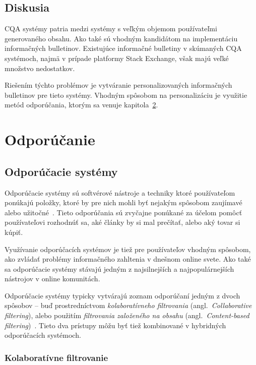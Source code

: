 \section{Diskusia}

CQA systémy patria medzi systémy s veľkým objemom používateľmi generovaného obsahu. Ako také sú vhodným kandidátom na
implementáciu informačných bulletinov. Existujúce informačné bulletiny v skúmaných CQA systémoch, najmä v prípade
platformy Stack Exchange, však majú veľké množstvo nedostatkov.

Riešením týchto problémov je vytváranie personalizovaných informačných bulletinov pre tieto systémy. Vhodným spôsobom
na personalizáciu je využitie metód odporúčania, ktorým sa venuje kapitola~\ref{rec}.





\chapter{Odporúčanie}\label{rec}

\section{Odporúčacie systémy}

Odporúčacie systémy sú softvérové nástroje a techniky ktoré používateľom ponúkajú položky, ktoré by pre nich mohli
byť nejakým spôsobom zaujímavé alebo užitočné~\cite{Handbook2011}. Tieto odporúčania sú zvyčajne ponúkané za účelom
pomôcť používateľovi rozhodnúť sa, aké články by si mal prečítať, alebo aký tovar si kúpiť.

Využívanie odporúčacích systémov je tiež pre používateľov vhodným spôsobom, ako zvládať problémy informačného zahltenia
v dnešnom online svete. Ako také sa odporúčacie systémy stávajú jedným z najsilnejších a najpopulárnejších nástrojov
v online komunitách.

Odporúčacie systémy typicky vytvárajú zoznam odporúčaní jedným z dvoch spôsobov -- buď prostredníctvom \emph{kolaboratívneho
filtrovania} (angl.~\emph{Collaborative filtering}), alebo použitím \emph{filtrovania založeného na obsahu}
(angl.~\emph{Content-based filtering})~\cite{Buhmann2011}. Tieto dva prístupy môžu byť tiež kombinované
v hybridných odporúčacích systémoch.

\subsection{Kolaboratívne filtrovanie}\label{rec:collab}

